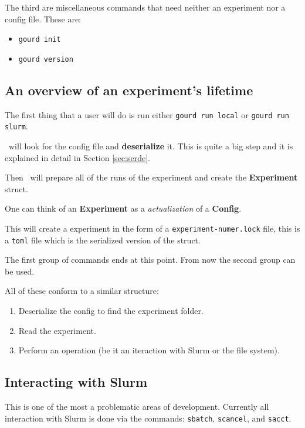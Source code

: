 The third are miscellaneous commands that need neither an experiment
nor a config file. These are:

\begin{itemize}
  \item \texttt{gourd init}
  \item \texttt{gourd version}
\end{itemize}

\subsection{An overview of an experiment's lifetime}

The first thing that a user will do is run either \texttt{gourd run local}
or \texttt{gourd run slurm}.

\gourd\ will look for the config file and \textbf{deserialize} it.
This is quite a big step and it is explained in detail in Section \ref{sec:serde}.

Then \gourd\ will prepare all of the runs of the experiment and create the
\textbf{Experiment} struct.

One can think of an \textbf{Experiment} as a \emph{actualization} of a \textbf{Config}.

This will create a experiment in the form of a \texttt{experiment-numer.lock}
file, this is a \texttt{toml} file which is the serialized version of the struct.

The first group of commands ends at this point. From now the second group can be used.

All of these conform to a similar structure:

\begin{enumerate}
  \item Deserialize the config to find the experiment folder.
  \item Read the experiment.
  \item Perform an operation (be it an iteraction with Slurm or the file system).
\end{enumerate}

\subsection{Interacting with Slurm}

This is one of the most a problematic areas of development.
Currently all interaction with Slurm is done via the commands:
\texttt{sbatch}, \texttt{scancel}, and \texttt{sacct}.

